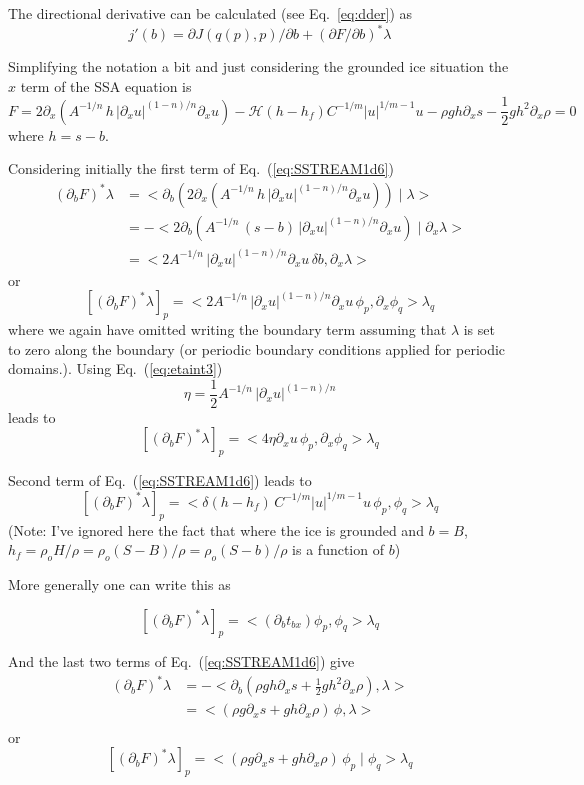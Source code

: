 \documentclass[10pt,a4paper]{book}
\newcommand{\He}{\mathcal{H}}
\newcommand{\p}{\partial}
\newcommand{\tbx}{t_{bx}}
\begin{document}
The directional derivative can be calculated (see Eq.~\ref{eq:dder}) as
\begin{equation}
j'(b)= \p J(q(p),p)/ \p b + (\p F / \p b)^\ast  \lambda
\label{eq:dder2}
\end{equation}

Simplifying the notation a bit and just considering the grounded ice situation the $x$ term of the SSA equation is 
\begin{equation}
F=2 \p_x \left ( A^{-1/n} \, h \,  | \p_x u|^{(1-n)/n}   \p_x u   \right ) - \He(h-h_f) C^{-1/m} |u|^{1/m-1 } u - \rho g h \p_x s - \frac{1}{2} g h^2 \p_x \rho =0
\label{eq:SSTREAM1d6}
\end{equation}
where $h=s-b$.

Considering initially the first term of Eq.~(\ref{eq:SSTREAM1d6})
\begin{align*}
  (\p_b F )^\ast  \lambda & = <\p_b  \left ( 2 \p_x ( A^{-1/n} \, h \, | \p_x u|^{(1-n)/n}   \p_x u ) \right )\mid \lambda>\\
                             & = - <  2 \p_b \left ( A^{-1/n} \, (s-b) \, | \p_x u|^{(1-n)/n}   \p_x u \right )\mid \p_x \lambda>\\
  & = < 2  A^{-1/n} \, | \p_x u|^{(1-n)/n}   \p_x u \, \delta b, \p_x \lambda>
\end{align*}
or
\[
  [(\p_b F )^\ast  \lambda ]_p =  <  2  A^{-1/n} \, | \p_x u|^{(1-n)/n}   \p_x u \, \phi_p, \p_x \phi_q> \lambda_q
\]
where we again have omitted writing the boundary term assuming that
$\lambda$ is set to zero along the boundary (or periodic boundary
conditions applied for periodic domains.). Using Eq.~(\ref{eq:etaint3}) 
\[
\eta= \frac{1}{2} A^{-1/n} \, |\p_{x} u|^{(1-n)/n}
\]
leads to
\[
  [(\p_b F )^\ast  \lambda ]_p =  <  4 \eta  \p_x u \, \phi_p, \p_x \phi_q> \lambda_q
\]



Second term of Eq.~(\ref{eq:SSTREAM1d6}) leads to
\[
  [(\p_b F )^\ast  \lambda]_p =   < \delta(h-h_f)   \, C^{-1/m} |u|^{1/m-1} u \, \phi_p, \phi_q > \lambda_q
\]
(Note: I've ignored here the fact that where the ice is grounded and
$b=B$, $h_f=\rho_o H /\rho=\rho_o (S-B) /\rho =\rho_o (S-b) /\rho$ is
a function of $b$)


More generally one can write this as

\[
    [(\p_b F )^\ast  \lambda]_p =   < (\p_b \tbx)  \phi_p, \phi_q > \lambda_q
\]



And the last two terms of Eq.~(\ref{eq:SSTREAM1d6}) give
\begin{align*}
  (\p_b F )^\ast  \lambda & =   - < \p_b \left (\rho g h \p_x s + \frac{1}{2} g h^2 \p_x \rho \right ), \lambda >  \\
                         & =    < (\rho g  \p_x s + g h \p_x \rho ) \, \phi, \lambda >  \\
\end{align*}
or
\[
[ (\p_b F )^\ast  \lambda]_p  =      < (\rho g  \p_x s + g h \p_x \rho ) \, \phi_p\mid \phi_q >  \lambda_q
\]
\end{document}
